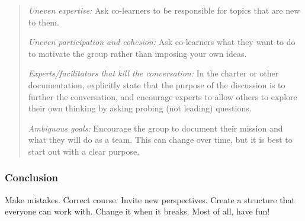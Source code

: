\begin{quote}
\emph{Uneven expertise:} Ask co-learners to be responsible for topics
that are new to them.

\emph{Uneven participation and cohesion:} Ask co-learners what they want
to do to motivate the group rather than imposing your own ideas.

\emph{Experts/facilitators that kill the conversation:} In the charter
or other documentation, explicitly state that the purpose of the
discussion is to further the conversation, and encourage experts to
allow others to explore their own thinking by asking probing (not
leading) questions.

\emph{Ambiguous goals:} Encourage the group to document their mission
and what they will do as a team. This can change over time, but it is
best to start out with a clear purpose.
\end{quote}

\subsubsection{Conclusion}

Make mistakes. Correct course. Invite new perspectives. Create a
structure that everyone can work with. Change it when it breaks. Most of
all, have fun!
